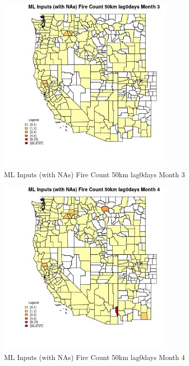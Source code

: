 \begin{figure} 
\centering  
\includegraphics[width=0.77\textwidth]{Code_Outputs/Report_ML_input_PM25_Step4_part_f_de_duplicated_aves_prioritize_24hr_obswNAs_CountyFire_Count_50km_lag0daysmedianMonth3.jpg} 
\caption{\label{fig:Report_ML_input_PM25_Step4_part_f_de_duplicated_aves_prioritize_24hr_obswNAsCountyFire_Count_50km_lag0daysmedianMonth3}ML Inputs (with NAs) Fire Count 50km lag0days Month 3} 
\end{figure} 
 

\begin{figure} 
\centering  
\includegraphics[width=0.77\textwidth]{Code_Outputs/Report_ML_input_PM25_Step4_part_f_de_duplicated_aves_prioritize_24hr_obswNAs_CountyFire_Count_50km_lag0daysmedianMonth4.jpg} 
\caption{\label{fig:Report_ML_input_PM25_Step4_part_f_de_duplicated_aves_prioritize_24hr_obswNAsCountyFire_Count_50km_lag0daysmedianMonth4}ML Inputs (with NAs) Fire Count 50km lag0days Month 4} 
\end{figure} 
 

